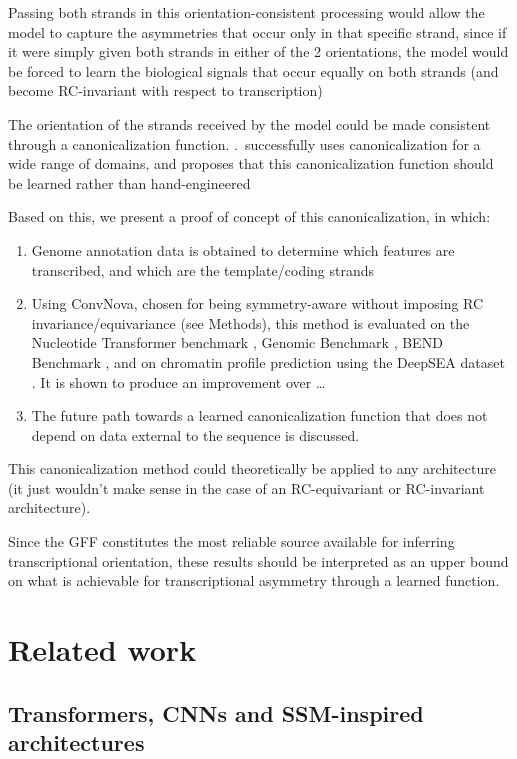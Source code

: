 \documentclass[   ]{article}
\begin{document}
Passing both strands in this orientation-consistent processing would
allow the model to capture the asymmetries that occur only in that
specific strand, since if it were simply given both strands in either of
the 2 orientations, the model would be forced to learn the biological
signals that occur equally on both strands (and become RC-invariant with
respect to transcription)

The orientation of the strands received by the model could be made
consistent through a canonicalization function. \cite{kabaEquivarianceLearnedCanonicalization2023}.~successfully
uses canonicalization for a wide range of domains, and proposes that
this canonicalization function should be learned rather than hand-engineered

Based on this, we present a proof of concept of this canonicalization, in which:
\begin{enumerate}
	\item Genome annotation data is obtained to determine which features are transcribed, and which are the template/coding strands
	\item Using ConvNova, chosen for being symmetry-aware without imposing RC invariance/equivariance (see Methods), this method is evaluated on the Nucleotide Transformer benchmark \citep{dalla-torreNucleotideTransformerBuilding2025}, Genomic Benchmark \citep{fengBenchmarkingDNAFoundation2025}, BEND Benchmark \citep{marinBENDBenchmarkingDNA2023}, and on chromatin profile prediction using the DeepSEA dataset \citep{zhouPredictingEffectsNoncoding2015}. It is shown to produce an improvement over \ldots{}
	\item The future path towards a learned canonicalization function that does not depend on data external to the sequence is discussed.
\end{enumerate}

This canonicalization method could theoretically be applied to any architecture (it just wouldn't make sense in the case of an RC-equivariant or RC-invariant architecture).

Since the GFF constitutes the most reliable source available for
inferring transcriptional orientation, these results should be
interpreted as an upper bound on what is achievable for transcriptional
asymmetry through a learned function. 
\section{Related work} 

\subsection{Transformers, CNNs and SSM-inspired architectures}
\label{sec:related_work_transformers_and_ssm}
\end{document}
